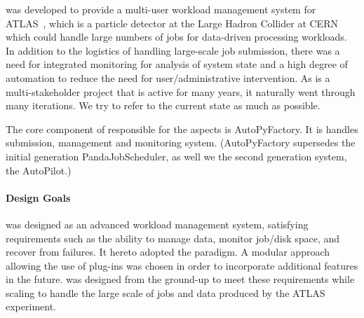 \documentclass{sig-alternate}
\begin{document}

\panda was developed to provide a multi-user workload management system for
ATLAS~\cite{aad2008atlas}, which is a particle detector at the Large Hadron
Collider at CERN which could handle large numbers of jobs for data-driven
processing workloads.
In addition to the logistics of handling large-scale job submission, there was
a need for integrated monitoring for analysis of system state and a high degree
of automation to reduce the need for user/administrative intervention.
As \panda is a multi-stakeholder project that is active for many years, it
naturally went through many iterations.
We try to refer to the current state as much as possible.

The core component of \panda responsible for the \pilot aspects is
AutoPyFactory\cite{Caballero:2012ka}.
It is handles \pilot submission, management and monitoring system.
(AutoPyFactory supersedes the initial generation PandaJobScheduler, as well we
the second generation system, the AutoPilot.)

\paragraph{Design Goals}
\panda was designed as an advanced workload management system,
satisfying requirements such as the ability
to manage data, monitor job/disk space, and recover from failures.
It hereto adopted the \pilot paradigm.
A modular approach allowing the use of plug-ins was chosen in order
to incorporate additional features in the future.
\panda was designed from the ground-up to meet these requirements
while scaling to handle the large scale of jobs and data produced
by the ATLAS experiment.
\end{document}
